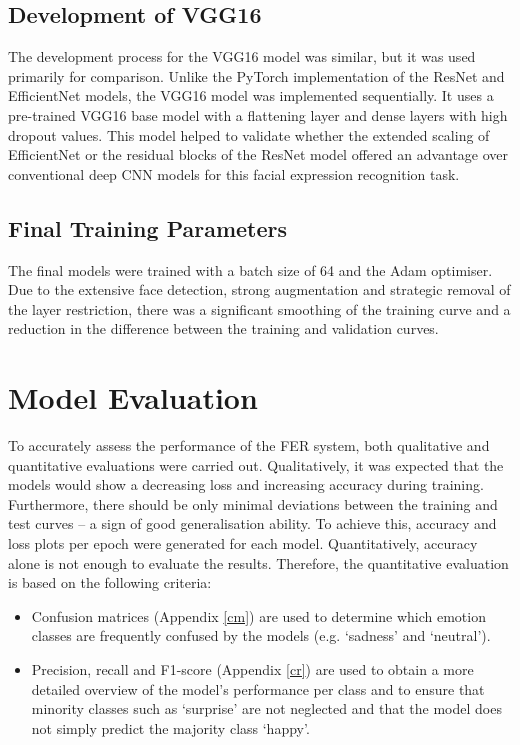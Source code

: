 \section{Development of VGG16}

The development process for the VGG16 model was similar, but it was used primarily for comparison. Unlike the PyTorch implementation of the ResNet and EfficientNet models, the VGG16 model was implemented sequentially. It uses a pre-trained VGG16 base model with a flattening layer and dense layers with high dropout values. This model helped to validate whether the extended scaling of EfficientNet or the residual blocks of the ResNet model offered an advantage over conventional deep CNN models for this facial expression recognition task.
\newline

\section{Final Training Parameters}

The final models were trained with a batch size of 64 and the Adam optimiser. Due to the extensive face detection, strong augmentation and strategic removal of the layer restriction, there was a significant smoothing of the training curve and a reduction in the difference between the training and validation curves.
\newline

\chapter{Model Evaluation}

To accurately assess the performance of the FER system, both qualitative and quantitative evaluations were carried out. Qualitatively, it was expected that the models would show a decreasing loss and increasing accuracy during training. Furthermore, there should be only minimal deviations between the training and test curves – a sign of good generalisation ability. To achieve this, accuracy and loss plots per epoch were generated for each model.
Quantitatively, accuracy alone is not enough to evaluate the results. Therefore, the quantitative evaluation is based on the following criteria:

\begin{itemize}
	\item Confusion matrices (Appendix \ref{cm}) are used to determine which emotion classes are frequently confused by the models (e.g. ‘sadness’ and ‘neutral’).
	\item Precision, recall and F1-score (Appendix \ref{cr}) are used to obtain a more detailed overview of the model’s performance per class and to ensure that minority classes such as ‘surprise’ are not neglected and that the model does not simply predict the majority class ‘happy’.
\end{itemize}

